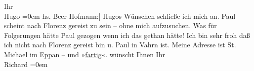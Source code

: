 \begin{ledgroupsized}[t]{13cm}
           \pstart
           Ihr{\\[\baselineskip]}\spacefill\mbox{Hugo}\pend
           \leftskip=0em{}\pstart
           \noindent{}{[}hs. Beer-Hofmann:{]} Hugos Wünschen schließe ich mich an. Paul scheint nach Florenz
               gereist zu sein – ohne mich aufzusuchen. Was für Folgerungen hätte Paul gezogen wenn ich das gethan hätte! Ich bin sehr froh daß
               ich nicht nach Florenz gereist bin u. Paul in Vahrn
               ist. Meine Adresse ist St. Michael im Eppan – und
                  »\uline{fartig}«.\pend
           \pstart
           \label{T_L00981_1v}\label{T_L00981_1h} wünscht Ihnen Ihr{\\[\baselineskip]}\spacefill\mbox{Richard}\pend
           \leftskip=0em{}
         
         \endnumbering{}\end{ledgroupsized}  \newcommand{\dateiname}{L00981}\newcommand{\titel}{Hugo von Hofmannsthal und Richard Beer-Hofmann an Arthur Schnitzler, 27. [9. 1899]}\newcommand{\editorInnen}{Martin Anton Müller und Gerd-Hermann Susen}
      